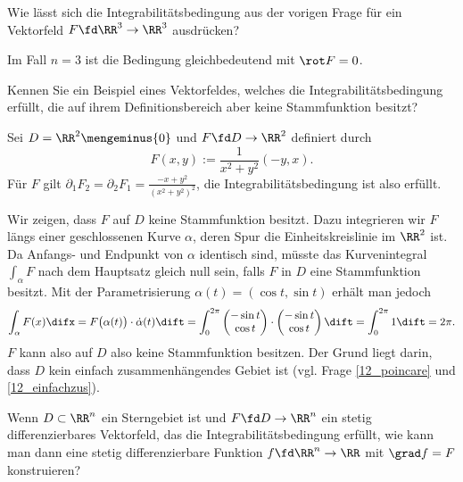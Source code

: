 \begin{frage}
  Wie lässt sich die Integrabilitätsbedingung aus der vorigen Frage 
  für ein Vektorfeld $F\fd \RR^3 \to \RR^3$ ausdrücken?
\end{frage} 

\begin{antwort}
  Im Fall $n=3$ ist die Bedingung gleichbedeutend mit $\rot F = 0$. \AntEnd 
\end{antwort} 

\begin{frage}
  Kennen Sie ein Beispiel eines Vektorfeldes, welches die 
  Integrabilitätsbedingung erfüllt, 
  die auf ihrem Definitionsbereich aber keine Stammfunktion besitzt?
\end{frage} 

\begin{antwort}
  Sei $D=\RR^2 \mengeminus\{ 0 \}$ und $F \fd D \to \RR^2$ definiert durch 
  \[
  F(x,y) := \frac{1}{x^2+y^2} (-y,x) .
  \]
  Für $F$ gilt $\partial_1 F_2 = \partial_2 F_1 = \frac{-x+y^2}{(x^2+y^2)^2}$, 
  die Integrabilitätsbedingung ist also erfüllt. 

  Wir zeigen, dass $F$ auf $D$ keine Stammfunktion 
  besitzt. Dazu integrieren wir $F$ längs einer geschlossenen Kurve $\alpha$, 
  deren Spur die Einheitskreislinie im $\RR^2$ ist. Da Anfangs- und Endpunkt 
  von $\alpha$ identisch sind, müsste das Kurvenintegral $\int_\alpha F$ 
  nach dem Hauptsatz gleich null sein, falls $F$ in $D$ eine Stammfunktion 
  besitzt. Mit der Parametrisierung $\alpha(t)=(\cos t, \sin t)$ 
  erhält man jedoch 
  \[
  \int_\alpha F(x) \difx = F\big( \alpha(t) \big) \cdot \dot{\alpha}(t) \dift 
  =
  \int_0^{2\pi} \begin{pmatrix} -\sin t \\ \cos t \end{pmatrix} 
  \cdot  
  \begin{pmatrix} -\sin t \\ \cos t \end{pmatrix} \dift = 
  \int_0^{2\pi} 1 \dift =2\pi. 
  \]
  $F$ kann also auf $D$ also keine Stammfunktion besitzen. 
  Der Grund liegt darin, dass $D$ kein einfach zusammenhängendes 
  Gebiet ist (vgl. Frage \ref{12_poincare} und \ref{12_einfachzus}). \AntEnd 
\end{antwort} 

\begin{frage}\label{12_poincare}
  Wenn $D\subset\RR^n$ ein Sterngebiet ist und $F\fd D\to\RR^n$ ein stetig 
  differenzierbares Vektorfeld, das die Integrabilitätsbedingung erfüllt, 
  wie kann man dann eine stetig differenzierbare Funktion 
  $f\fd\RR^n\to\RR$ mit $\grad f=F$ konstruieren?
\end{frage}


